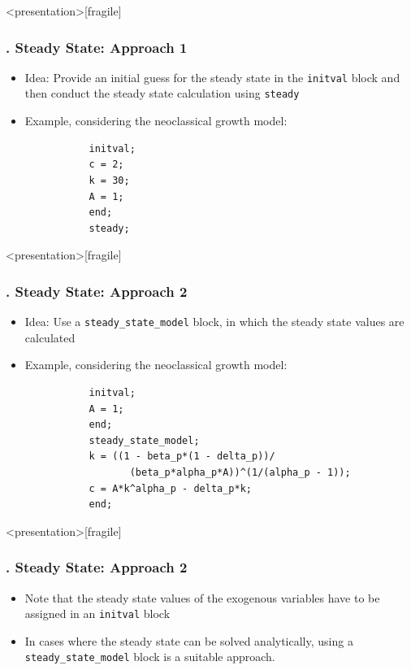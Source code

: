 \documentclass[11pt,aspectratio=169]{beamer}
\begin{document}
\begin{frame}<presentation>[fragile]
	\frametitle{{\thesection.\thesubsection} Steady State: Approach 1}
	\begin{itemize}
		\item Idea: Provide an initial guess for the steady state in the \texttt{initval} block and then conduct the steady state calculation using \texttt{steady}
		\item Example, considering the neoclassical growth model:
		\begin{verbatim}
		   initval;
		   c = 2;
		   k = 30;
		   A = 1;
		   end;
		   steady;
		\end{verbatim}
	\end{itemize}
\end{frame}
\begin{frame}<presentation>[fragile]
	\frametitle{{\thesection.\thesubsection} Steady State: Approach 2}
	\begin{itemize}
		\item Idea: Use a \texttt{steady\_state\_model} block, in which the steady state values are calculated
		\item Example, considering the neoclassical growth model:
		\begin{verbatim}
		   initval;
		   A = 1;
		   end;		
		   steady_state_model;
		   k = ((1 - beta_p*(1 - delta_p))/
		          (beta_p*alpha_p*A))^(1/(alpha_p - 1));
		   c = A*k^alpha_p - delta_p*k;
		   end;
		\end{verbatim}
	\end{itemize}
\end{frame}
\begin{frame}<presentation>[fragile]
	\frametitle{{\thesection.\thesubsection} Steady State: Approach 2}
	\begin{itemize}
		\item Note that the steady state values of the exogenous variables have to be assigned in an \texttt{initval} block
		\item In cases where the steady state can be solved analytically, using a \texttt{steady\_state\_model} block is a suitable approach.
	\end{itemize}
\end{frame}
\end{document}
